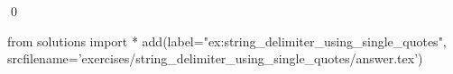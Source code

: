 
\begin{ex} 
  \label{ex:string_delimiter_using_single_quotes}
  
  \qed
\end{ex} 
\begin{python0}
from solutions import *
add(label="ex:string_delimiter_using_single_quotes",
    srcfilename='exercises/string_delimiter_using_single_quotes/answer.tex') 
\end{python0}
